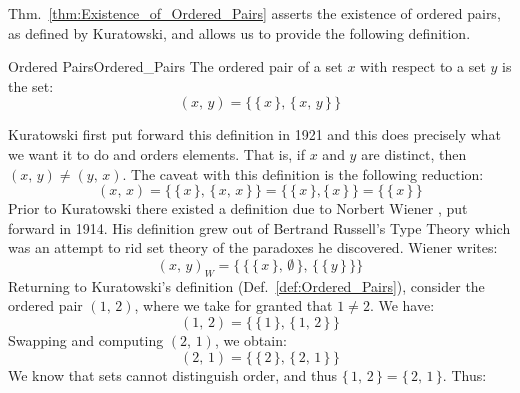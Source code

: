         Thm.~\ref{thm:Existence_of_Ordered_Pairs} asserts the existence of
        ordered pairs, as defined by Kuratowski, and allows
        us to provide the following definition.
        \begin{fdefinition}{Ordered Pairs}{Ordered_Pairs}
            The \gls{ordered pair} of a \gls{set} $x$ with respect to a set
            $y$ is the set:
            \begin{equation*}
                (x,\,y)=\big\{\,\{\,x\,\},\,\{\,x,\,y\,\}\,\big\}
            \end{equation*}
        \end{fdefinition}
        Kuratowski first put forward this definition
        in 1921 and this does precisely what we want it to do and orders
        elements. That is, if $x$ and $y$ are distinct, then
        $(x,\,y)\ne(y,\,x)$. The caveat with this definition is the following
        reduction:
        \begin{equation}
            (x,\,x)
            =\big\{\,\{\,x\,\},\,\{\,x,\,x\,\}\,\big\}
            =\big\{\,\{\,x\,\},\{\,x\,\}\,\big\}
            =\big\{\,\{\,x\,\}\,\big\}
        \end{equation}
        Prior to Kuratowski there existed a definition due to Norbert Wiener%
        , put forward in 1914. His definition grew out of
        Bertrand Russell's Type Theory
        which was an attempt to rid set theory of the paradoxes he discovered.
        Wiener writes:
        \begin{equation}
            (x,\,y)_{W}=\Big\{\,\big\{\,\{\,x\,\},\,\emptyset\,\big\},\,
                                \big\{\,\{\,y\,\}\,\big\}\Big\}
        \end{equation}
        Returning to Kuratowski's definition (Def.~\ref{def:Ordered_Pairs}),
        consider the ordered pair $(1,\,2)$, where we take for granted that
        $1\ne{2}$. We have:
        \begin{equation}
            (1,\,2)=\big\{\,\{\,1\,\},\,\{\,1,\,2\,\}\,\big\}
        \end{equation}
        Swapping and computing $(2,\,1)$, we obtain:
        \begin{equation}
            (2,\,1)=\big\{\,\{\,2\,\},\,\{\,2,\,1\,\}\,\big\}
        \end{equation}
        We know that sets cannot distinguish order, and thus
        $\{\,1,\,2\,\}=\{\,2,\,1\,\}$. Thus:
